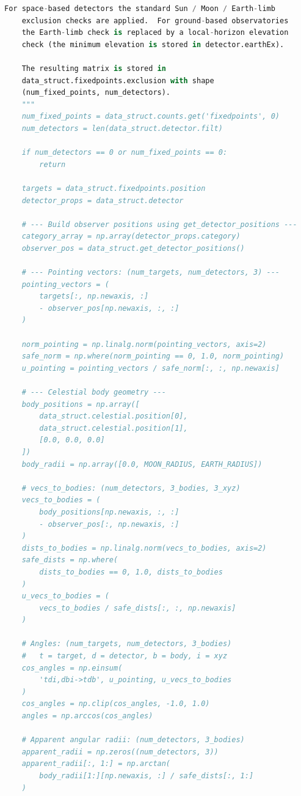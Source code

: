\documentclass[10pt,a4paper]{report}
\begin{document}
\begin{lstlisting}[language=Python,caption={exclusion.py Source Code},label={code:exclusion}]
    For space-based detectors the standard Sun / Moon / Earth-limb
    exclusion checks are applied.  For ground-based observatories
    the Earth-limb check is replaced by a local-horizon elevation
    check (the minimum elevation is stored in detector.earthEx).

    The resulting matrix is stored in
    data_struct.fixedpoints.exclusion with shape
    (num_fixed_points, num_detectors).
    """
    num_fixed_points = data_struct.counts.get('fixedpoints', 0)
    num_detectors = len(data_struct.detector.filt)

    if num_detectors == 0 or num_fixed_points == 0:
        return

    targets = data_struct.fixedpoints.position
    detector_props = data_struct.detector

    # --- Build observer positions using get_detector_positions ---
    category_array = np.array(detector_props.category)
    observer_pos = data_struct.get_detector_positions()

    # --- Pointing vectors: (num_targets, num_detectors, 3) ---
    pointing_vectors = (
        targets[:, np.newaxis, :]
        - observer_pos[np.newaxis, :, :]
    )

    norm_pointing = np.linalg.norm(pointing_vectors, axis=2)
    safe_norm = np.where(norm_pointing == 0, 1.0, norm_pointing)
    u_pointing = pointing_vectors / safe_norm[:, :, np.newaxis]

    # --- Celestial body geometry ---
    body_positions = np.array([
        data_struct.celestial.position[0],
        data_struct.celestial.position[1],
        [0.0, 0.0, 0.0]
    ])
    body_radii = np.array([0.0, MOON_RADIUS, EARTH_RADIUS])

    # vecs_to_bodies: (num_detectors, 3_bodies, 3_xyz)
    vecs_to_bodies = (
        body_positions[np.newaxis, :, :]
        - observer_pos[:, np.newaxis, :]
    )
    dists_to_bodies = np.linalg.norm(vecs_to_bodies, axis=2)
    safe_dists = np.where(
        dists_to_bodies == 0, 1.0, dists_to_bodies
    )
    u_vecs_to_bodies = (
        vecs_to_bodies / safe_dists[:, :, np.newaxis]
    )

    # Angles: (num_targets, num_detectors, 3_bodies)
    #   t = target, d = detector, b = body, i = xyz
    cos_angles = np.einsum(
        'tdi,dbi->tdb', u_pointing, u_vecs_to_bodies
    )
    cos_angles = np.clip(cos_angles, -1.0, 1.0)
    angles = np.arccos(cos_angles)

    # Apparent angular radii: (num_detectors, 3_bodies)
    apparent_radii = np.zeros((num_detectors, 3))
    apparent_radii[:, 1:] = np.arctan(
        body_radii[1:][np.newaxis, :] / safe_dists[:, 1:]
    )


\end{lstlisting}
\end{document}
